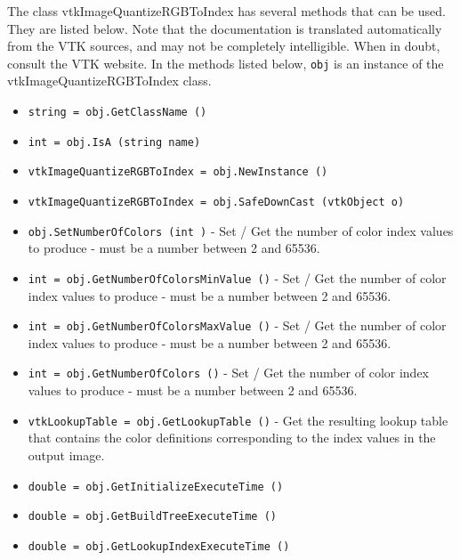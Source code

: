 The class vtkImageQuantizeRGBToIndex has several methods that can be used.
  They are listed below.
Note that the documentation is translated automatically from the VTK sources,
and may not be completely intelligible.  When in doubt, consult the VTK website.
In the methods listed below, \verb|obj| is an instance of the vtkImageQuantizeRGBToIndex class.
\begin{itemize}
\item  \verb|string = obj.GetClassName ()|

\item  \verb|int = obj.IsA (string name)|

\item  \verb|vtkImageQuantizeRGBToIndex = obj.NewInstance ()|

\item  \verb|vtkImageQuantizeRGBToIndex = obj.SafeDownCast (vtkObject o)|

\item  \verb|obj.SetNumberOfColors (int )| -  Set / Get the number of color index values to produce - must be 
 a number between 2 and 65536.

\item  \verb|int = obj.GetNumberOfColorsMinValue ()| -  Set / Get the number of color index values to produce - must be 
 a number between 2 and 65536.

\item  \verb|int = obj.GetNumberOfColorsMaxValue ()| -  Set / Get the number of color index values to produce - must be 
 a number between 2 and 65536.

\item  \verb|int = obj.GetNumberOfColors ()| -  Set / Get the number of color index values to produce - must be 
 a number between 2 and 65536.

\item  \verb|vtkLookupTable = obj.GetLookupTable ()| -  Get the resulting lookup table that contains the color definitions
 corresponding to the index values in the output image.

\item  \verb|double = obj.GetInitializeExecuteTime ()|

\item  \verb|double = obj.GetBuildTreeExecuteTime ()|

\item  \verb|double = obj.GetLookupIndexExecuteTime ()|

\end{itemize}
